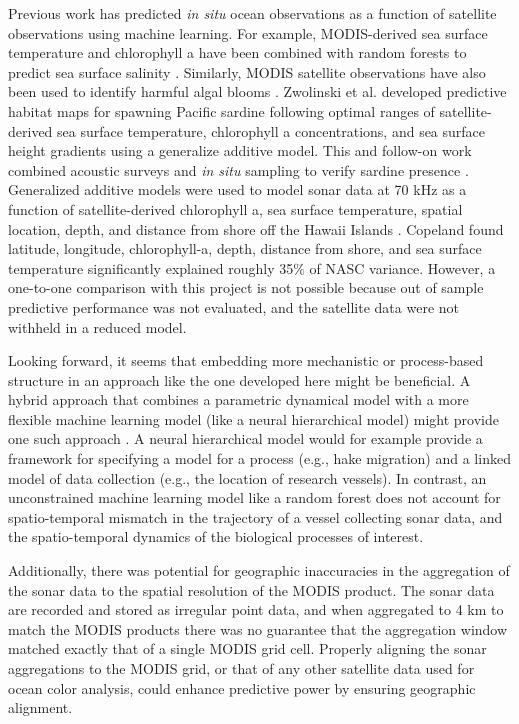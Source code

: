 \documentclass[10pt,letterpaper]{article}
\begin{document}
Previous work has predicted \emph{in situ} ocean observations as a function of satellite observations using machine learning. 
For example, MODIS-derived sea surface temperature and chlorophyll a have been combined with random forests to predict sea surface salinity \cite{liu2015multivariable}.
Similarly, MODIS satellite observations have also been used to identify harmful algal blooms \cite{song2015learning}. 
Zwolinski et al. \cite{zwolinski2011predicting} developed predictive habitat maps for spawning Pacific sardine following optimal ranges of satellite-derived sea surface temperature, chlorophyll a concentrations, and sea surface height gradients using a generalize additive model. This and follow-on work combined acoustic surveys and \emph{in situ} sampling to verify sardine presence \cite{zwolinski2011predicting} \cite{demer2014corroboration}. 
Generalized additive models were used to model sonar data at 70 kHz as a function of satellite-derived chlorophyll a, sea surface temperature, spatial location, depth, and distance from shore off the Hawaii Islands \cite{copeland2016influences}. Copeland \cite{copeland2016influences} found latitude, longitude, chlorophyll-a, depth, distance from shore, and sea surface temperature significantly explained roughly 35\% of NASC variance. However, a one-to-one comparison with this project is not possible because out of sample predictive performance was not evaluated, and the satellite data were not withheld in a reduced model. 

Looking forward, it seems that embedding more mechanistic or process-based structure in an approach like the one developed here might be beneficial. 
A hybrid approach that combines a parametric dynamical model with a more flexible machine learning model (like a neural hierarchical model) might provide one such approach \cite{joseph2020}. 
A neural hierarchical model would for example provide a framework for specifying a model for a process (e.g., hake migration) and a linked model of data collection (e.g., the location of research vessels).
In contrast, an unconstrained machine learning model like a random forest does not account for spatio-temporal mismatch in the trajectory of a vessel collecting sonar data, and the spatio-temporal dynamics of the biological processes of interest.

Additionally, there was potential for geographic inaccuracies in the aggregation of the sonar data to the spatial resolution of the MODIS product. The sonar data are recorded and stored as irregular point data, and when aggregated to 4 km to match the MODIS products there was no guarantee that the aggregation window matched exactly that of a single MODIS grid cell. Properly aligning the sonar aggregations to the MODIS grid, or that of any other satellite data used for ocean color analysis, could enhance predictive power by ensuring geographic alignment. 
\end{document}
